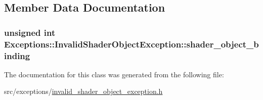 \subsection{Member Data Documentation}
\hypertarget{class_exceptions_1_1_invalid_shader_object_exception_a80365b85ba22f19254ea8e04cd0454e0}{}
\subsubsection[{shader\+\_\+object\+\_\+binding}]{\setlength{\rightskip}{0pt plus 5cm}unsigned int Exceptions\+::\+Invalid\+Shader\+Object\+Exception\+::shader\+\_\+object\+\_\+binding\hspace{0.3cm}{\ttfamily [private]}}\label{class_exceptions_1_1_invalid_shader_object_exception_a80365b85ba22f19254ea8e04cd0454e0}


The documentation for this class was generated from the following file\+:\begin{DoxyCompactItemize}
\item 
src/exceptions/\hyperlink{invalid__shader__object__exception_8h}{invalid\+\_\+shader\+\_\+object\+\_\+exception.\+h}\end{DoxyCompactItemize}
